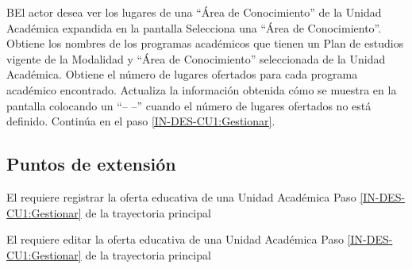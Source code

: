 \begin{UCtrayectoriaA}{B}{El actor desea ver los lugares de una ``Área de Conocimiento'' de la Unidad Académica expandida en la pantalla}
	\UCpaso [\UCactor] Selecciona una ``Área de Conocimiento''.
	\UCpaso Obtiene los nombres de los programas académicos que tienen un Plan de estudios vigente de la Modalidad y ``Área de Conocimiento'' seleccionada de la Unidad Académica.
	\UCpaso Obtiene el número de lugares ofertados para cada programa académico encontrado.
	\UCpaso Actualiza la información obtenida cómo se muestra en la pantalla  colocando un ``-- --'' cuando el número de lugares ofertados no está definido.
	\UCpaso[] Continúa en el paso \ref{IN-DES-CU1:Gestionar}.
\end{UCtrayectoriaA}

\subsection{Puntos de extensión}	 

{El  requiere registrar la oferta educativa de una Unidad Académica}
{Paso \ref{IN-DES-CU1:Gestionar} de la trayectoria principal}
{}

{El  requiere editar la oferta educativa de una Unidad Académica}
{Paso \ref{IN-DES-CU1:Gestionar} de la trayectoria principal}
{}